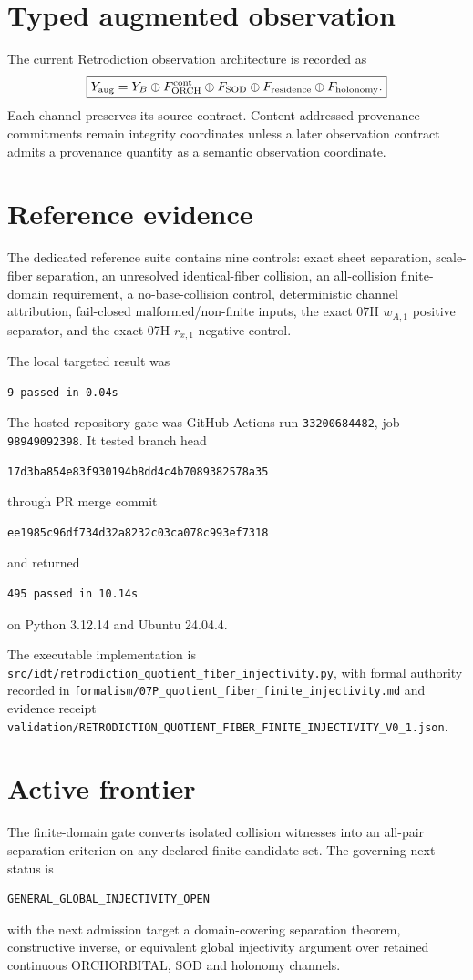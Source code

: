 \section{Typed augmented observation}

The current Retrodiction observation architecture is recorded as
\[
\boxed{
Y_{\rm aug}
=
Y_B
\oplus F_{\rm ORCH}^{\rm cont}
\oplus F_{\rm SOD}
\oplus F_{\rm residence}
\oplus F_{\rm holonomy}.
}
\]
Each channel preserves its source contract.  Content-addressed provenance commitments remain integrity coordinates unless a later observation contract admits a provenance quantity as a semantic observation coordinate.

\section{Reference evidence}

The dedicated reference suite contains nine controls: exact sheet separation, scale-fiber separation, an unresolved identical-fiber collision, an all-collision finite-domain requirement, a no-base-collision control, deterministic channel attribution, fail-closed malformed/non-finite inputs, the exact 07H $w_{A,1}$ positive separator, and the exact 07H $r_{x,1}$ negative control.

The local targeted result was
\begin{verbatim}
9 passed in 0.04s
\end{verbatim}

The hosted repository gate was GitHub Actions run \texttt{33200684482}, job \texttt{98949092398}.  It tested branch head
\begin{verbatim}
17d3ba854e83f930194b8dd4c4b7089382578a35
\end{verbatim}
through PR merge commit
\begin{verbatim}
ee1985c96df734d32a8232c03ca078c993ef7318
\end{verbatim}
and returned
\begin{verbatim}
495 passed in 10.14s
\end{verbatim}
on Python 3.12.14 and Ubuntu 24.04.4.

The executable implementation is
\texttt{src/idt/retrodiction\_quotient\_fiber\_injectivity.py},
with formal authority recorded in
\texttt{formalism/07P\_quotient\_fiber\_finite\_injectivity.md}
and evidence receipt
\texttt{validation/RETRODICTION\_QUOTIENT\_FIBER\_FINITE\_INJECTIVITY\_V0\_1.json}.

\section{Active frontier}

The finite-domain gate converts isolated collision witnesses into an all-pair separation criterion on any declared finite candidate set.  The governing next status is
\begin{verbatim}
GENERAL_GLOBAL_INJECTIVITY_OPEN
\end{verbatim}
with the next admission target a domain-covering separation theorem, constructive inverse, or equivalent global injectivity argument over retained continuous ORCHORBITAL, SOD and holonomy channels.
